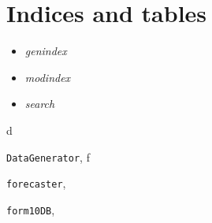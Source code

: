 \documentclass[letterpaper,10pt,english]{sphinxmanual}
\begin{document}
\chapter{Indices and tables}
\label{index:indices-and-tables}\begin{itemize}
\item {} 
\emph{genindex}

\item {} 
\emph{modindex}

\item {} 
\emph{search}

\end{itemize}


\renewcommand{\indexname}{Python Module Index}
\begin{theindex}
\def\bigletter#1{{\Large\sffamily#1}\nopagebreak\vspace{1mm}}
\bigletter{d}
\item {\texttt{DataGenerator}}, \pageref{DataGenerator:module-DataGenerator}
\indexspace
\bigletter{f}
\item {\texttt{forecaster}}, \pageref{forecaster:module-forecaster}
\item {\texttt{form10DB}}, \pageref{utils:module-form10DB}
\end{theindex}

\renewcommand{\indexname}{Index}
\printindex
\end{document}
